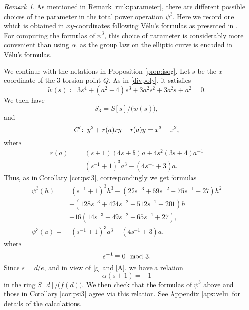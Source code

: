 \documentclass{gtpart}
\theoremstyle{definition}
\theoremstyle{remark}
\newtheorem{rmk}[thm]{Remark}
\def\co{\colon\thinspace}
\newcommand{\Tw}{\widetilde{w}}
\newcommand{\md}{~~{\rm mod}~}
\newcommand{\A}{\alpha}
\newcommand{\p}{\psi^3}
\begin{document}
\begin{rmk}
\label{rmk:velu}
 As mentioned in Remark \ref{rmk:parameter}, there are different possible choices of the parameter in the total power operation $\p$.  
 Here we record one which is obtained in $xy$-coordinates following V\'elu's formulas \cite{velu} as presented in \cite[Section 2.4]{kohel}.  
 For computing the formulas of $\p$, this choice of parameter is considerably more convenient than using $\A$, 
 as the group law on the elliptic curve is encoded in V\'elu's formulas.  

 We continue with the notations in Proposition \ref{prop:isog}.  
 Let $s$ be the $x$-coordinate of the 3-torsion point $Q$.  
 As in \eqref{divpoly}, it satisfies 
 \begin{equation}
 \label{Tw}
  \Tw(s) \coloneqq 3 s^4 + (a^2 + 4) s^3 + 3 a^2 s^2 + 3 a^2 s + a^2 = 0.  
 \end{equation}
 We then have 
 \[
  S_3 = S[s] \big/ \big( \Tw(s) \big), 
 \]
 and 
 \[
  C' \co y^2 + r(a) x y + r(a) y = x^3 + x^2, 
 \]
 where 
 \begin{equation*}
 \begin{split}
  r(a) = & ~ (s + 1) (4 s + 5) a + 4 s^2 (3 s + 4) a^{-1} \\
       = & ~ (s^{-1} + 1)^3 a^3 - (4 s^{-1} + 3) a.  
 \end{split}
 \end{equation*}
 Thus, as in Corollary \ref{cor:psi3}, correspondingly we get formulas 
 \begin{equation*}
 \begin{split}
  \p(h) = & ~ (s^{-1} + 1)^3 h^3 - (22 s^{-3} + 69 s^{-2} + 75 s^{-1} + 27) h^2 \\
          & + (128 s^{-3} + 424 s^{-2} + 512 s^{-1} + 201) h \\
          & - 16 (14 s^{-3} + 49 s^{-2} + 65 s^{-1} + 27), \\
  \p(a) = & ~ (s^{-1} + 1)^3 a^3 - (4 s^{-1} + 3) a, 
 \end{split}
 \end{equation*}
 where 
 \begin{equation}
 \label{tmod3}
  s^{-1} \equiv 0 \md 3.  
 \end{equation}
 Since $s = d / e$, and in view of \eqref{g} and \eqref{A}, we have a relation 
 \[
  \A (s + 1) = -1 
 \]
 in the ring $S[d] \big/ \big( f(d) \big)$.  
 We then check that the formulas of $\p$ above and those in Corollary \ref{cor:psi3} agree via this relation.  
 See Appendix \ref{apx:velu} for details of the calculations.  
\end{rmk}
\end{document}
